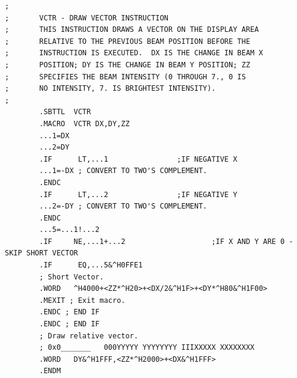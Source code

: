 \begin{lstlisting}
;
;       VCTR - DRAW VECTOR INSTRUCTION
;       THIS INSTRUCTION DRAWS A VECTOR ON THE DISPLAY AREA
;       RELATIVE TO THE PREVIOUS BEAM POSITION BEFORE THE
;       INSTRUCTION IS EXECUTED.  DX IS THE CHANGE IN BEAM X
;       POSITION; DY IS THE CHANGE IN BEAM Y POSITION; ZZ 
;       SPECIFIES THE BEAM INTENSITY (0 THROUGH 7., 0 IS
;       NO INTENSITY, 7. IS BRIGHTEST INTENSITY).
;
        .SBTTL  VCTR
        .MACRO  VCTR DX,DY,ZZ
        ...1=DX
        ...2=DY
        .IF      LT,...1                ;IF NEGATIVE X
        ...1=-DX ; CONVERT TO TWO'S COMPLEMENT.
        .ENDC
        .IF      LT,...2                ;IF NEGATIVE Y
        ...2=-DY ; CONVERT TO TWO'S COMPLEMENT.
        .ENDC
        ...5=...1!...2
        .IF     NE,...1+...2                    ;IF X AND Y ARE 0 - SKIP SHORT VECTOR
        .IF      EQ,...5&^H0FFE1
        ; Short Vector.
        .WORD   ^H4000+<ZZ*^H20>+<DX/2&^H1F>+<DY*^H80&^H1F00>
        .MEXIT ; Exit macro.
        .ENDC ; END IF
        .ENDC ; END IF
        ; Draw relative vector. 
        ; 0x0_______   000YYYYY YYYYYYYY IIIXXXXX XXXXXXXX
        .WORD   DY&^H1FFF,<ZZ*^H2000>+<DX&^H1FFF>
        .ENDM
\end{lstlisting}
